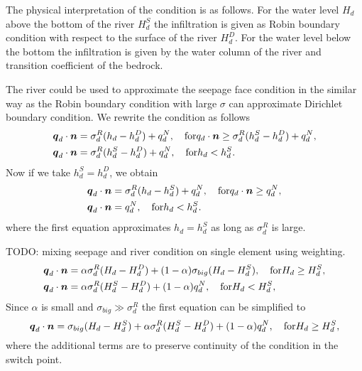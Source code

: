 The physical interpretation of the condition is as follows. For the water level $H_d$ above the bottom of the river $H_d^S$ the infiltration is given 
as Robin boundary condition with respect to the surface of the river $H_d^D$. 
For the water level below the bottom the infiltration is given by the water column of the river and transition coefficient of the bedrock.

The river could be used to approximate the seepage face condition in the similar way as the Robin boundary condition with large $\sigma$ 
can approximate Dirichlet boundary condition. We rewrite the condition as follows
\begin{align}
  \mathbf{\boldsymbol{q}}_d \cdot \mathbf{\boldsymbol{n}} &= \sigma_d^R ( h_d - h_d^D) + q_d^N, \quad \text{for} q_d \cdot \mathbf{\boldsymbol{n}} \ge \sigma_d^R ( h_d^S - h_d^D) + q_d^N,\\
  \mathbf{\boldsymbol{q}}_d \cdot \mathbf{\boldsymbol{n}} &= \sigma_d^R ( h_d^S - h_d^D)+q_d^N, \quad \text{for} h_d < h_d^S.
\end{align}
Now if we take $h_d^S=h_d^D$, we obtain
\begin{align}
  \mathbf{\boldsymbol{q}}_d \cdot \mathbf{\boldsymbol{n}} &= \sigma_d^R ( h_d - h_d^S) + q_d^N, \quad \text{for} q_d \cdot \mathbf{\boldsymbol{n}} \ge q_d^N,\\
  \mathbf{\boldsymbol{q}}_d \cdot \mathbf{\boldsymbol{n}} &= q_d^N, \quad \text{for} h_d < h_d^S.
\end{align}
where the first equation approximates $h_d = h_d^S$ as long as $\sigma_d^R$ is large.

TODO: mixing seepage and river condition on single element using weighting.
\begin{align}
  \mathbf{\boldsymbol{q}}_d \cdot \mathbf{\boldsymbol{n}} &= \alpha \sigma_d^R ( H_d - H_d^D) + (1-\alpha) \sigma_{big}(H_d - H_d^S), \quad \text{for} H_d \ge H_d^S,\\
  \mathbf{\boldsymbol{q}}_d \cdot \mathbf{\boldsymbol{n}} &= \alpha \sigma_d^R ( H_d^S - H_d^D)+(1-\alpha) q_d^N, \quad \text{for} H_d < H_d^S,
\end{align}
Since $\alpha$ is small and $\sigma_{big} \gg \sigma_d^R$ the first equation can be simplified to 
\[
    \mathbf{\boldsymbol{q}}_d \cdot \mathbf{\boldsymbol{n}} = \sigma_{big}(H_d - H_d^S) + \alpha \sigma_d^R ( H_d^S - H_d^D)+(1-\alpha) q_d^N, \quad \text{for} H_d \ge H_d^S,
\]
where the additional terms are to preserve continuity of the condition in the switch point.



